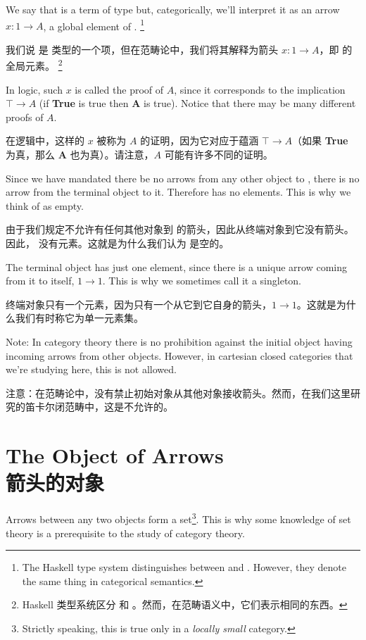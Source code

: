 \documentclass[DaoFP]{subfiles}
\begin{document}
 We say that  is a term of type  but, categorically, we'll interpret it as an arrow $x : 1 \to A$, a global element of . \footnote{The Haskell type system distinguishes between  and . However, they denote the same thing in categorical semantics.}

 我们说  是  类型的一个项，但在范畴论中，我们将其解释为箭头 $x : 1 \to A$，即  的全局元素。 \footnote{Haskell 类型系统区分  和 。然而，在范畴语义中，它们表示相同的东西。}

 In logic, such $ x$ is called the proof of $ A$, since it corresponds to the implication $ \top \to A$ (if \textbf{True} is true then \textbf{A} is true). Notice that there may be many different proofs of $A$.

 在逻辑中，这样的 $x$ 被称为 $A$ 的证明，因为它对应于蕴涵 $ \top \to A$（如果 \textbf{True} 为真，那么 \textbf{A} 也为真）。请注意，$A$ 可能有许多不同的证明。

 Since we have mandated there be no arrows from any other object to , there is no arrow from the terminal object to it. Therefore  has no elements. This is why we think of  as empty.

 由于我们规定不允许有任何其他对象到  的箭头，因此从终端对象到它没有箭头。因此， 没有元素。这就是为什么我们认为  是空的。

 The terminal object has just one element, since there is a unique arrow coming from it to itself, $ 1 \to 1$. This is why we sometimes call it a singleton.

 终端对象只有一个元素，因为只有一个从它到它自身的箭头，$1 \to 1$。这就是为什么我们有时称它为单一元素集。

 Note: In category theory there is no prohibition against the initial object having incoming arrows from other objects. However, in cartesian closed categories that we're studying here, this is not allowed.

 注意：在范畴论中，没有禁止初始对象从其他对象接收箭头。然而，在我们这里研究的笛卡尔闭范畴中，这是不允许的。

 \section{The Object of Arrows\\箭头的对象}

 Arrows between any two objects form a set\footnote{Strictly speaking, this is true only in a \emph{locally small} category.}. This is why some knowledge of set theory is a prerequisite to the study of category theory.
\end{document}
